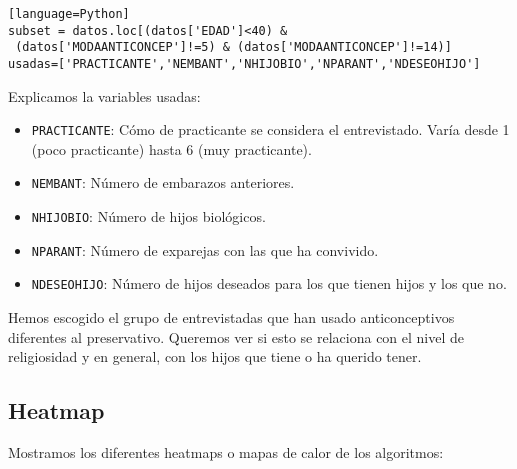 	
	\begin{lstlisting}[frame=single][language=Python]
subset = datos.loc[(datos['EDAD']<40) &
 (datos['MODAANTICONCEP']!=5) & (datos['MODAANTICONCEP']!=14)]
usadas=['PRACTICANTE','NEMBANT','NHIJOBIO','NPARANT','NDESEOHIJO']
	\end{lstlisting}
	
	
	Explicamos la variables usadas:
	\begin{itemize}
		\item \texttt{PRACTICANTE}: Cómo de practicante se considera el entrevistado. Varía desde 1 (poco practicante) hasta 6 (muy practicante). 
		\item \texttt{NEMBANT}: Número de embarazos anteriores.
		\item \texttt{NHIJOBIO}: Número de hijos biológicos.
		\item \texttt{NPARANT}: Número de exparejas con las que ha convivido.
		\item \texttt{NDESEOHIJO}: Número de hijos deseados para los que tienen hijos y los que no.
	\end{itemize}
	
	Hemos escogido el grupo de entrevistadas que han usado anticonceptivos diferentes al preservativo. Queremos ver si esto se relaciona con el nivel de religiosidad y en general, con los hijos que tiene o ha querido tener.
	
	
	
	\subsection{Heatmap}
	Mostramos los diferentes heatmaps o mapas de calor de los algoritmos:
	
	\begin{figure}[H]
		\centering
		
	\end{figure}
	
	
	\begin{figure}[H]
		\centering
		
		
		
	\end{figure}
	
